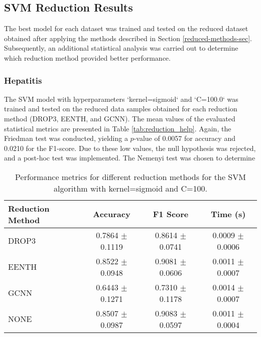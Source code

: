 \subsection{SVM Reduction Results}
The best model for each dataset was trained and tested on the reduced dataset obtained after applying the methods described in Section \ref{reduced-methods-sec}. Subsequently, an additional statistical analysis was carried out to determine which reduction method provided better performance.

\subsubsection{Hepatitis}
The SVM model with hyperparameters `kernel=sigmoid` and `C=100.0` was trained and tested on the reduced data samples obtained for each reduction method (DROP3, EENTH, and GCNN). The mean values of the evaluated statistical metrics are presented in Table \ref{tab:reduction_help}. Again, the Friedman test was conducted, yielding a $p$-value of 0.0057 for accuracy and 0.0210 for the F1-score. Due to these low values, the null hypothesis was rejected, and a post-hoc test was implemented. The Nemenyi test was chosen to determine

\begin{table}[h!]
\centering
\begin{tabular}{|l|c|c|c|}
\hline
\textbf{Reduction Method} & \textbf{Accuracy} & \textbf{F1 Score} & \textbf{Time (s)} \\
\hline
DROP3 & 0.7864 $\pm$ 0.1119 & 0.8614 $\pm$ 0.0741 & 0.0009 $\pm$ 0.0006 \\
\hline
EENTH & 0.8522 $\pm$ 0.0948 & 0.9081 $\pm$ 0.0606 & 0.0011 $\pm$ 0.0007 \\
\hline
GCNN  & 0.6443 $\pm$ 0.1271 & 0.7310 $\pm$ 0.1178 & 0.0014 $\pm$ 0.0007 \\
\hline
NONE  & 0.8507 $\pm$ 0.0987 & 0.9083 $\pm$ 0.0597 & 0.0011 $\pm$ 0.0004 \\
\hline
\end{tabular}
\caption{Performance metrics for different reduction methods for the SVM algorithm with kernel=sigmoid and C=100.}
\label{tab:reduction_hep}
\end{table}

